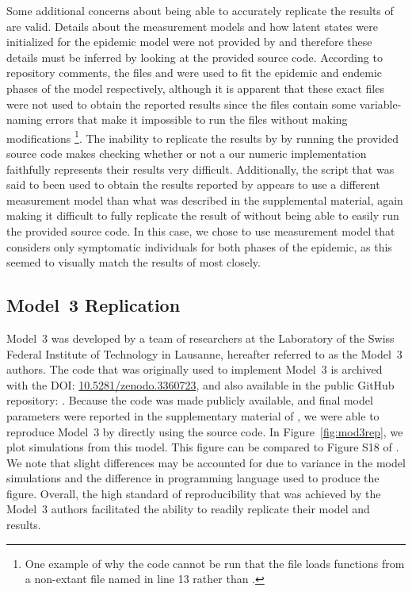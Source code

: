 Some additional concerns about being able to accurately replicate the results of \citet{lee20} are valid.
Details about the measurement models and how latent states were initialized for the epidemic model were not provided by \citet{lee20} and therefore these details must be inferred by looking at the provided source code.
According to repository comments, the files  and  were used to fit the epidemic and endemic phases of the model respectively, although it is apparent that these exact files were not used to obtain the reported results since the files contain some variable-naming errors that make it impossible to run the files without making modifications \footnote{One example of why the code cannot be run that the file loads functions from a non-extant file named  in line 13 rather than .}.
The inability to replicate the results by \citet{lee20} by running the provided source code makes checking whether or not a our numeric implementation faithfully represents their results very difficult.
Additionally, the script that was said to been used to obtain the results reported by \citet{lee20} appears to use a different measurement model than what was described in the supplemental material, again making it difficult to fully replicate the result of \citet{lee20} without being able to easily run the provided source code.
In this case, we chose to use measurement model that considers only symptomatic individuals for both phases of the epidemic, as this seemed to visually match the results of \citet{lee20} most closely.

\subsection{Model~3 Replication}

Model~3 was developed by a team of researchers at the Laboratory of the Swiss Federal Institute of Technology in Lausanne, hereafter referred to as the Model~3 authors.
The code that was originally used to implement Model~3 is archived with the DOI: \url{10.5281/zenodo.3360723}, and also available in the public GitHub repository: .
Because the code was made publicly available, and final model parameters were reported in the supplementary material of \citet{lee20}, we were able to reproduce Model~3 by directly using the source code.
In Figure~\ref{fig:mod3rep}, we plot simulations from this model.
This figure can be compared to Figure S18 of \citet{lee20}.
We note that slight differences may be accounted for due to variance in the model simulations and the difference in programming language used to produce the figure.
Overall, the high standard of reproducibility that was achieved by the Model~3 authors facilitated the ability to readily replicate their model and results.



